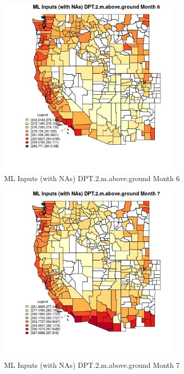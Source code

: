 \begin{figure} 
\centering  
\includegraphics[width=0.77\textwidth]{Code_Outputs/Report_ML_input_PM25_Step4_part_f_de_duplicated_aveswNAs_CountyDPT2mabovegroundmedianMonth6.jpg} 
\caption{\label{fig:Report_ML_input_PM25_Step4_part_f_de_duplicated_aveswNAsCountyDPT2mabovegroundmedianMonth6}ML Inputs (with NAs) DPT.2.m.above.ground Month 6} 
\end{figure} 
 

\begin{figure} 
\centering  
\includegraphics[width=0.77\textwidth]{Code_Outputs/Report_ML_input_PM25_Step4_part_f_de_duplicated_aveswNAs_CountyDPT2mabovegroundmedianMonth7.jpg} 
\caption{\label{fig:Report_ML_input_PM25_Step4_part_f_de_duplicated_aveswNAsCountyDPT2mabovegroundmedianMonth7}ML Inputs (with NAs) DPT.2.m.above.ground Month 7} 
\end{figure} 
 

